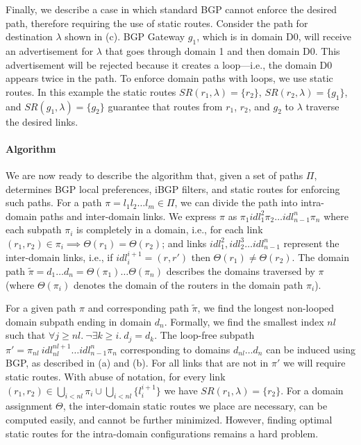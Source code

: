 Finally, we describe a case in which standard BGP cannot enforce
the desired path, therefore requiring the use of static routes.
Consider the path for destination $\lambda$ 
shown in (c). BGP Gateway $g_1$, which is in
domain D0, 
will receive an advertisement for $\lambda$ that goes through domain
1 and then domain D0.
This advertisement will be rejected because it creates a loop---i.e., the domain D0
appears twice in the path. 
To enforce domain paths with loops, we use static routes. In this example
the static routes
$SR(r_1,\lambda) = \{r_2\}$, $SR(r_2,\lambda) = \{g_1\}$, and $SR(g_1,\lambda) = \{g_2\}$ 
guarantee that routes from $r_1$, $r_2$, and $g_2$ to $\lambda$ traverse the desired links.

\paragraph{Algorithm}
We are now ready to describe the algorithm that,
given a set of paths $\Pi$, determines
BGP local preferences, iBGP filters, and static routes for enforcing such paths.
For a path $\pi = l_1 l_2 \ldots l_m \in \Pi$, we
can divide the path into intra-domain paths and inter-domain
links. We express $\pi$ as 
$\pi_1 idl_1^2 \pi_2 \ldots idl_{n-1}^n \pi_n$ where
each subpath $\pi_i$ is completely in a
domain, i.e., for each 
link $(r_1,r_2) \in \pi_i \implies \Theta(r_1) = \Theta(r_2)$;
and links $idl_1^2, idl_2^3 \ldots idl_{n-1}^n$ 
represent the inter-domain links, i.e., 
if $idl_i^{i+1}=(r,r')$ then $\Theta(r_1) \neq \Theta(r_2)$. 
The domain path
$\tilde{\pi} = d_1 \ldots d_n=\Theta(\pi_1)\ldots \Theta(\pi_n)$ describes the 
domains traversed by $\pi$ (where
$\Theta(\pi_i)$ denotes the domain of the routers in the 
domain path $\pi_i$). 


For a given path $\pi$ and corresponding path $\tilde{\pi}$,
we find the longest non-looped domain subpath ending in domain
$d_n$. Formally, we find the smallest index $nl$ such that
$\forall j \geq nl. ~\neg\exists k \geq i.~d_j = d_k$. 
The loop-free subpath $\pi'=\pi_{nl} ~idl_{nl}^{nl+1}\ldots idl_{n-1}^n \pi_n$ corresponding to
domains $d_{nl} \ldots d_n$
can be induced using BGP, as described in (a)
and (b).
For all links that are not in $\pi'$
we will require static routes.
With abuse of notation, for every link $(r_1,r_2)\in\bigcup_{i< nl} \pi_i\cup \bigcup_{i< nl}\{l_i^{i+1}\}$ 
we have
$SR(r_1, \lambda) = \{r_2\}$. 
For a domain assignment $\Theta$, the 
inter-domain static routes we place
 are necessary, can be  computed easily, and cannot be further minimized.
However, 
finding optimal static routes for the intra-domain configurations remains a
hard problem. 

